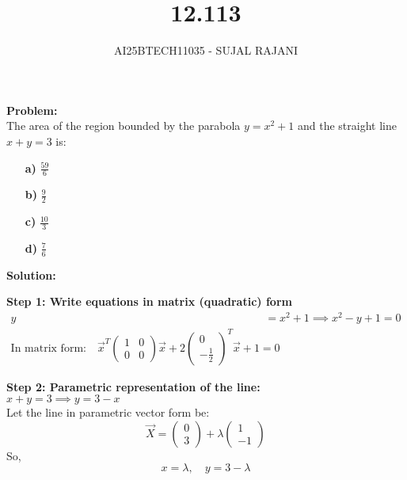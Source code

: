 \documentclass[journal,12pt,onecolumn]{IEEEtran}
\begin{document}
\title{12.113}
\author{AI25BTECH11035 - SUJAL RAJANI}
{\let\newpage\relax\maketitle}


\textbf{Problem:} \\
The area of the region bounded by the parabola \( y = x^2 + 1 \) and the straight line \( x + y = 3 \) is:

\begin{enumerate}
    \item[\textbf{a)}] \( \frac{59}{6} \) 
    \item[\textbf{b)}] \( \frac{9}{2} \)
    \item[\textbf{c)}] \( \frac{10}{3} \)
    \item[\textbf{d)}] \( \frac{7}{6} \)
\end{enumerate}

\textbf{Solution:}

\textbf{Step 1: Write equations in matrix (quadratic) form}
\begin{align*}
y &= x^2 + 1 \implies x^2 - y + 1 = 0 \\
\text{In matrix form:} \quad \vec{x}^T 
\begin{pmatrix} 1 & 0 \\ 0 & 0 \end{pmatrix}
\vec{x} + 2
\begin{pmatrix} 0 \\ -\frac{1}{2} \end{pmatrix}^T
\vec{x} + 1 = 0
\end{align*}

\textbf{Step 2: Parametric representation of the line:} \\
\( x + y = 3 \implies y = 3 - x \) \\
Let the line in parametric vector form be:
\[
\vec{X} = \begin{pmatrix} 0 \\ 3 \end{pmatrix} + \lambda \begin{pmatrix} 1 \\ -1 \end{pmatrix}
\]
So,
\[
x = \lambda,\quad y = 3 - \lambda
\]
\end{document}
